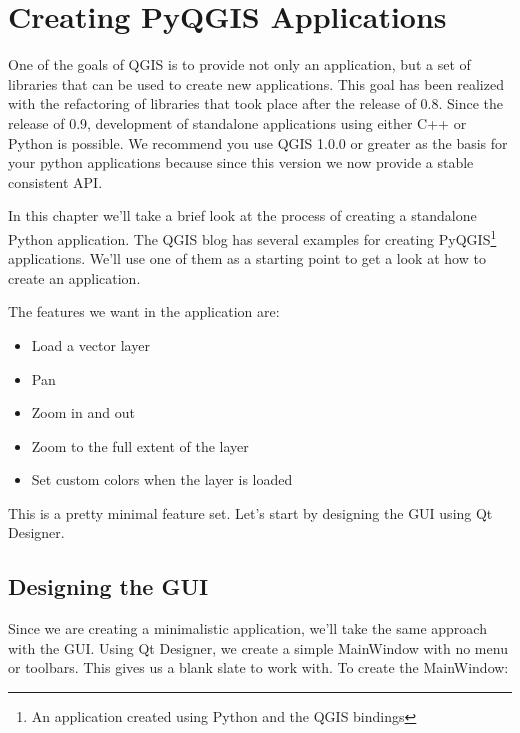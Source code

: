 
\section{Creating PyQGIS Applications}


One of the goals of QGIS is to provide not only an application, but a set of
libraries that can be used to create new applications. This goal has been
realized with the refactoring of libraries that took place after the release
of 0.8. Since the release of 0.9, development of standalone applications using
either C++ or Python is possible. We recommend you use QGIS 1.0.0 or greater
as the basis for your python applications because since this version we now
provide a stable consistent API.

In this chapter we'll take a brief look at the process of creating a
standalone Python application. The QGIS blog has several examples for creating
PyQGIS\footnote{An application created using Python and the QGIS bindings}
applications. We'll use one of them as a starting point to get a look at how
to create an application.

The features we want in the application are:

\begin{itemize}
\item Load a vector layer
\item Pan
\item Zoom in and out
\item Zoom to the full extent of the layer
\item Set custom colors when the layer is loaded
\end{itemize} 

This is a pretty minimal feature set. Let's start by designing the GUI using
Qt Designer. 

\subsection{Designing the GUI}

Since we are creating a minimalistic application, we'll take the same
approach with the GUI. Using Qt Designer, we create a simple MainWindow with
no menu or toolbars. This gives us a blank slate to work with. To create the
MainWindow:

